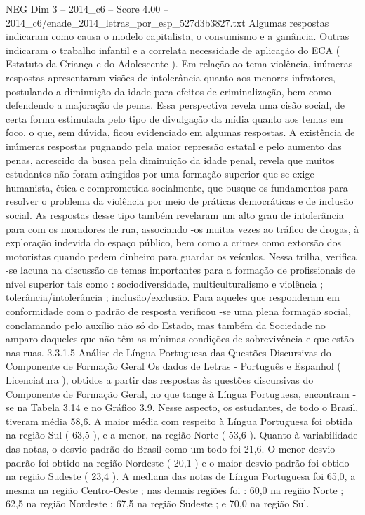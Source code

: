 \begin{textsample}{NEG Dim 3 – 2014\_c6 – Score 4.00 – 2014\_c6/enade\_2014\_letras\_por\_esp\_527d3b3827.txt}
Algumas respostas indicaram como causa o modelo capitalista, o consumismo e a ganância.
Outras indicaram o trabalho infantil e a correlata necessidade de aplicação do ECA ( Estatuto da Criança e do Adolescente ).
Em relação ao tema violência, inúmeras respostas apresentaram visões de intolerância quanto aos menores infratores, postulando a diminuição da idade para efeitos de criminalização, bem como defendendo a majoração de penas.
Essa perspectiva revela uma cisão social, de certa forma estimulada pelo tipo de divulgação da mídia quanto aos temas em foco, o que, sem dúvida, ficou evidenciado em algumas respostas.
A existência de inúmeras respostas pugnando pela maior repressão estatal e pelo aumento das penas, acrescido da busca pela diminuição da idade penal, revela que muitos estudantes não foram atingidos por uma formação superior que se exige humanista, ética e comprometida socialmente, que busque os fundamentos para resolver o problema da violência por meio de práticas democráticas e de inclusão social.
As respostas desse tipo também revelaram um alto grau de intolerância para com os moradores de rua, associando -os muitas vezes ao tráfico de drogas, à exploração indevida do espaço público, bem como a crimes como extorsão dos motoristas quando pedem dinheiro para guardar os veículos.
Nessa trilha, verifica -se lacuna na discussão de temas importantes para a formação de profissionais de nível superior tais como : sociodiversidade, multiculturalismo e violência ; tolerância/intolerância ; inclusão/exclusão.
Para aqueles que responderam em conformidade com o padrão de resposta verificou -se uma plena formação social, conclamando pelo auxílio não só do Estado, mas também da Sociedade no amparo daqueles que não têm as mínimas condições de sobrevivência e que estão nas ruas. 3.3.1.5 Análise de Língua Portuguesa das Questões Discursivas do Componente de Formação Geral Os dados de Letras - Português e Espanhol ( Licenciatura ), obtidos a partir das respostas às questões discursivas do Componente de Formação Geral, no que tange à Língua Portuguesa, encontram -se na Tabela 3.14 e no Gráfico 3.9.
Nesse aspecto, os estudantes, de todo o Brasil, tiveram média 58,6.
A maior média com respeito à Língua Portuguesa foi obtida na região Sul ( 63,5 ), e a menor, na região Norte ( 53,6 ).
Quanto à variabilidade das notas, o desvio padrão do Brasil como um todo foi 21,6.
O menor desvio padrão foi obtido na região Nordeste ( 20,1 ) e o maior desvio padrão foi obtido na região Sudeste ( 23,4 ).
A mediana das notas de Língua Portuguesa foi 65,0, a mesma na região Centro-Oeste ; nas demais regiões foi : 60,0 na região Norte ; 62,5 na região Nordeste ; 67,5 na região Sudeste ; e 70,0 na região Sul.

\end{textsample}

